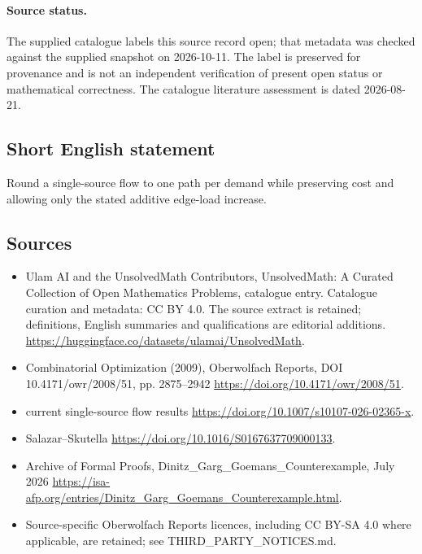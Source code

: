 \documentclass[11pt]{article}
\begin{document}
\paragraph{Source status.}
The supplied catalogue labels this source record open; that metadata was checked against the supplied snapshot on 2026-10-11. The label is preserved for provenance and is not an independent verification of present open status or mathematical correctness. The catalogue literature assessment is dated 2026-08-21.
\subsection{Short English statement}
Round a single-source flow to one path per demand while preserving cost and allowing only the stated additive edge-load increase.
\subsection{Sources}
\begin{itemize}
\item[\hypertarget{source:statement:1}{S1}] Ulam AI and the UnsolvedMath Contributors, UnsolvedMath: A Curated Collection of Open Mathematics Problems, catalogue entry. Catalogue curation and metadata: CC BY 4.0. The source extract is retained; definitions, English summaries and qualifications are editorial additions.
\url{https://huggingface.co/datasets/ulamai/UnsolvedMath}.
\item[\hypertarget{source:statement:2}{S2}] Combinatorial Optimization (2009), Oberwolfach Reports, DOI 10.4171/owr/2008/51, pp. 2875--2942
\url{https://doi.org/10.4171/owr/2008/51}.
\item[\hypertarget{source:statement:3}{S3}] current single-source flow results
\url{https://doi.org/10.1007/s10107-026-02365-x}.
\item[\hypertarget{source:statement:4}{S4}] Salazar--Skutella
\url{https://doi.org/10.1016/S0167637709000133}.
\item[\hypertarget{source:statement:5}{S5}] Archive of Formal Proofs, Dinitz\_Garg\_Goemans\_Counterexample, July 2026
\url{https://isa-afp.org/entries/Dinitz_Garg_Goemans_Counterexample.html}.
\item Source-specific Oberwolfach Reports licences, including CC BY-SA 4.0 where applicable, are retained; see THIRD\_PARTY\_NOTICES.md.
\end{itemize}
\end{document}
